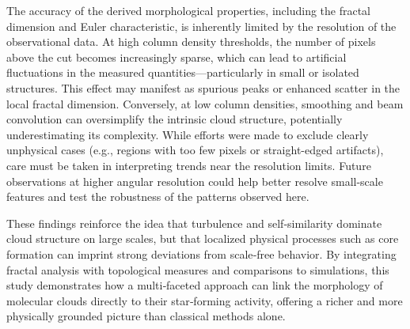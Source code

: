 The accuracy of the derived morphological properties, including the fractal dimension and Euler characteristic, is inherently limited by the resolution of the observational data. At high column density thresholds, the number of pixels above the cut becomes increasingly sparse, which can lead to artificial fluctuations in the measured quantities—particularly in small or isolated structures. This effect may manifest as spurious peaks or enhanced scatter in the local fractal dimension. Conversely, at low column densities, smoothing and beam convolution can oversimplify the intrinsic cloud structure, potentially underestimating its complexity. While efforts were made to exclude clearly unphysical cases (e.g., regions with too few pixels or straight-edged artifacts), care must be taken in interpreting trends near the resolution limits. 
Future observations at higher angular resolution could help better resolve small-scale features and test the robustness of the patterns observed here.

These findings reinforce the idea that turbulence and self‑similarity dominate cloud structure on large scales, but that localized physical processes such as core formation can imprint strong deviations from scale‑free behavior.  
By integrating fractal analysis with topological measures and comparisons to simulations, this study demonstrates how a multi‑faceted approach can link the morphology of molecular clouds directly to their star‑forming activity, offering a richer and more physically grounded picture than classical methods alone.

